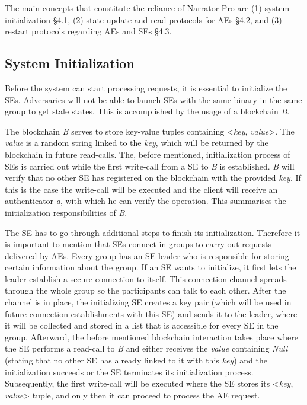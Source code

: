 The main concepts that constitute the reliance of Narrator-Pro are (1) system initialization §4.1, (2) state update and read protocols for AEs §4.2, and (3) restart protocols regarding AEs and SEs §4.3.

\subsection{System Initialization}

Before the system can start processing requests, it is essential to initialize the SEs. Adversaries will not be able to launch SEs with the same binary in the same group to get stale states. This is accomplished by the usage of a blockchain \textit{B}. 

The blockchain \textit{B} serves to store key-value tuples containing <\textit{key}, \textit{value}>. The \textit{value} is a random string linked to the \textit{key}, which will be returned by the blockchain in future read-calls. The, before mentioned, initialization process of SEs is carried out while the first write-call from a SE to \textit{B} is established. \textit{B} will verify that no other SE has registered on the blockchain with the provided \textit{key}. If this is the case the write-call will be executed and the client will receive an authenticator \textit{a}, with which he can verify the operation. This summarises the initialization responsibilities of \textit{B}.

The SE has to go through additional steps to finish its initialization. Therefore it is important to mention that SEs connect in groups to carry out requests delivered by AEs. Every group has an SE leader who is responsible for storing certain information about the group. If an SE wants to initialize, it first lets the leader establish a secure connection to itself. This connection channel spreads through the whole group so the participants can talk to each other. After the channel is in place, the initializing SE creates a key pair (which will be used in future connection establishments with this SE) and sends it to the leader, where it will be collected and stored in a list that is accessible for every SE in the group. Afterward, the before mentioned blockchain interaction takes place where the SE performs a read-call to \textit{B} and either receives the \textit{value} containing \textit{Null} (stating that no other SE has already linked to it with this \textit{key}) and the initialization succeeds or the SE terminates its initialization process. Subsequently, the first write-call will be executed where the SE stores its <\textit{key}, \textit{value}> tuple, and only then it can proceed to process the AE request.

